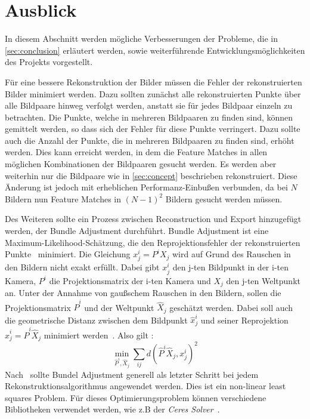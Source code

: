 \chapter{Ausblick}
\label{sec:outlook}

In diesem Abschnitt werden mögliche Verbesserungen der Probleme, die in \cref{sec:conclusion} erläutert werden, sowie weiterführende Entwicklungsmöglichkeiten des Projekts vorgestellt.

Für eine bessere Rekonstruktion der Bilder müssen die Fehler der rekonstruierten Bilder minimiert werden.
Dazu sollten zunächst alle rekonstruierten Punkte über alle Bildpaare hinweg verfolgt werden, anstatt sie für jedes Bildpaar einzeln zu betrachten.
Die Punkte, welche in mehreren Bildpaaren zu finden sind, können gemittelt werden, so dass sich der Fehler für diese Punkte verringert.
Dazu sollte auch die Anzahl der Punkte, die in mehreren Bildpaaren zu finden sind, erhöht werden.
Dies kann erreicht werden, in dem die Feature Matches in allen möglichen Kombinationen der Bildpaaren gesucht werden.
Es werden aber weiterhin nur die Bildpaare wie in \cref{sec:concept} beschrieben rekonstruiert.
Diese Änderung ist jedoch mit erheblichen Performanz-Einbußen verbunden, da bei $N$ Bildern nun Feature Matches in $(N-1)^2$ Bildern gesucht werden müssen. 

Des Weiteren sollte ein Prozess zwischen Reconstruction und Export hinzugefügt werden, der Bundle Adjustment durchführt. 
Bundle Adjustment ist eine Maximum-Likelihood-Schätzung, die den Reprojektionsfehler der rekonstruierten Punkte~\cite[Kapitel 18.1]{hartley_2003} minimiert.
Die Gleichung $x^i_j = P^iX_j$ wird auf Grund des Rauschen in den Bildern nicht exakt erfüllt.
Dabei gibt $x^i_j$ den j-ten Bildpunkt in der i-ten Kamera, $P^i$ die Projektionsmatrix der i-ten Kamera und $X_j$ den j-ten Weltpunkt an.
Unter der Annahme von gaußschem Rauschen in den Bildern, sollen die Projektionsmatrix $\hat{P}^i$ und der Weltpunkt $\hat{X}_j$ geschätzt werden.
Dabei soll auch die geometrische Distanz zwischen dem Bildpunkt $\hat{x}^i_j$ und seiner Reprojektion $\hat{x}^i_j = \hat{P}^i\hat{X}_j$ minimiert werden~\cite[Kapitel 18.1]{hartley_2003}.
Also gilt \cite[Equation 18.1]{hartley_2003}:
\[\min_{\hat{P}^i,\hat{X}_j}\sum_{ij}d(\hat{P}^i\hat{X}_j,x^i_j)^2\]
Nach~\cite[Kapitel 18.1]{hartley_2003} sollte Bundel Adjustment generell als letzter Schritt bei jedem Rekonstruktionsalgorithmus angewendet werden.
Dies ist ein non-linear least squares Problem. %
Für dieses Optimierungsproblem können verschiedene Bibliotheken verwendet werden, wie z.B der \emph{Ceres Solver}~\cite{ceres-solver}.
 
